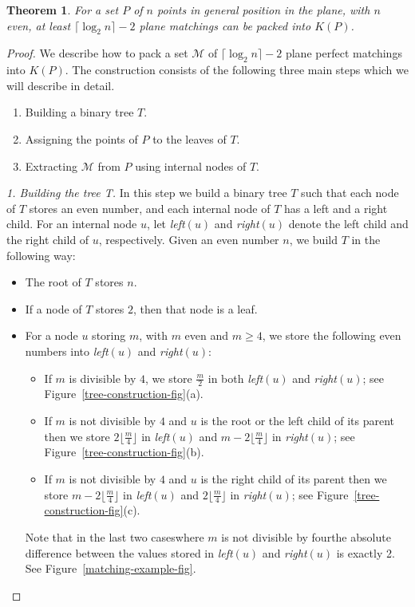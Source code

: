 \documentclass[11pt,a4paper]{article}
\newcommand{\LC}[1]{{\em left$(#1)$}}
\newcommand{\RC}[1]{{\em right$(#1)$}}
\newcommand{\Kn}[1]{K#1}
\newtheorem{theorem}{Theorem}
\begin{document}
\begin{theorem}
For a set $P$ of $n$ points in general position in the plane, with $n$ even, at least $\lceil\log_2{n}\rceil-2$ plane matchings can be packed into $\Kn{(P)}$.
\end{theorem}
\begin{proof}
We describe how to pack a set $\mathcal{M}$ of $\lceil\log_2{n}\rceil-2$ plane perfect matchings into $\Kn{(P)}$. The construction consists of the following three main steps which we will describe in detail.

\begin{enumerate}
  \item Building a binary tree $T$.
  \item Assigning the points of $P$ to the leaves of $T$.
  \item Extracting $\mathcal{M}$ from $P$ using internal nodes of $T$.
\end{enumerate}

\begin{paragraph}{\em \small 1. Building the tree T.}
In this step we build a binary tree $T$ such that each node of $T$ stores an even number, and each internal node of $T$ has a left and a right child. For an internal node $u$, let \LC{u} and \RC{u} denote the left child and the right child of $u$, respectively. Given an even number $n$, we build $T$ in the following way:
\begin{itemize}
  \item The root of $T$ stores $n$.
  \item If a node of $T$ stores $2$, then that node is a leaf.
  \item For a node $u$ storing $m$, with $m$ even and $m\ge 4$, we store the following even numbers into \LC{u} and \RC{u}:
    \begin{itemize}
	\item If $m$ is divisible by $4$, we store $\frac{m}{2}$ in both \LC{u} and \RC{u}; see Figure~\ref{tree-construction-fig}(a).
	\item If $m$ is not divisible by $4$ and $u$ is the root or the left child of its parent then we store $2\lfloor\frac{m}{4}\rfloor$ in \LC{u} and $m-2\lfloor\frac{m}{4}\rfloor$ in \RC{u}; see Figure~\ref{tree-construction-fig}(b).
	\item If $m$ is not divisible by $4$ and $u$ is the right child of its parent then we store $m-2\lfloor\frac{m}{4}\rfloor$ in \LC{u} and $2\lfloor\frac{m}{4}\rfloor$ in \RC{u}; see Figure~\ref{tree-construction-fig}(c).
    \end{itemize}
Note that in the last two cases\textemdash where $m$ is not divisible by four\textemdash the absolute difference between the values stored in \LC{u} and \RC{u} is exactly 2. See Figure~\ref{matching-example-fig}.
\end{itemize}
\end{paragraph}


\end{proof}
\end{document}
